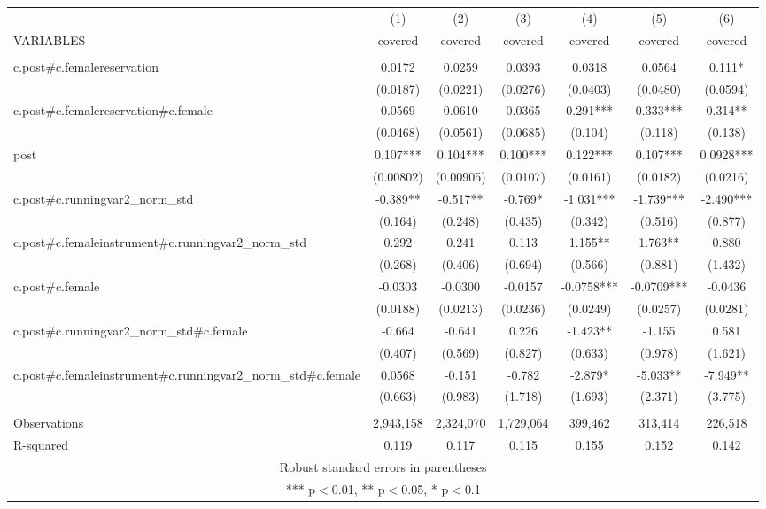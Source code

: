 \begin{tabular}{lcccccc} \hline
 & (1) & (2) & (3) & (4) & (5) & (6) \\
VARIABLES & covered & covered & covered & covered & covered & covered \\ \hline
 &  &  &  &  &  &  \\
c.post\#c.femalereservation & 0.0172 & 0.0259 & 0.0393 & 0.0318 & 0.0564 & 0.111* \\
 & (0.0187) & (0.0221) & (0.0276) & (0.0403) & (0.0480) & (0.0594) \\
c.post\#c.femalereservation\#c.female & 0.0569 & 0.0610 & 0.0365 & 0.291*** & 0.333*** & 0.314** \\
 & (0.0468) & (0.0561) & (0.0685) & (0.104) & (0.118) & (0.138) \\
post & 0.107*** & 0.104*** & 0.100*** & 0.122*** & 0.107*** & 0.0928*** \\
 & (0.00802) & (0.00905) & (0.0107) & (0.0161) & (0.0182) & (0.0216) \\
c.post\#c.runningvar2\_norm\_std & -0.389** & -0.517** & -0.769* & -1.031*** & -1.739*** & -2.490*** \\
 & (0.164) & (0.248) & (0.435) & (0.342) & (0.516) & (0.877) \\
c.post\#c.femaleinstrument\#c.runningvar2\_norm\_std & 0.292 & 0.241 & 0.113 & 1.155** & 1.763** & 0.880 \\
 & (0.268) & (0.406) & (0.694) & (0.566) & (0.881) & (1.432) \\
c.post\#c.female & -0.0303 & -0.0300 & -0.0157 & -0.0758*** & -0.0709*** & -0.0436 \\
 & (0.0188) & (0.0213) & (0.0236) & (0.0249) & (0.0257) & (0.0281) \\
c.post\#c.runningvar2\_norm\_std\#c.female & -0.664 & -0.641 & 0.226 & -1.423** & -1.155 & 0.581 \\
 & (0.407) & (0.569) & (0.827) & (0.633) & (0.978) & (1.621) \\
c.post\#c.femaleinstrument\#c.runningvar2\_norm\_std\#c.female & 0.0568 & -0.151 & -0.782 & -2.879* & -5.033** & -7.949** \\
 & (0.663) & (0.983) & (1.718) & (1.693) & (2.371) & (3.775) \\
 &  &  &  &  &  &  \\
Observations & 2,943,158 & 2,324,070 & 1,729,064 & 399,462 & 313,414 & 226,518 \\
 R-squared & 0.119 & 0.117 & 0.115 & 0.155 & 0.152 & 0.142 \\ \hline
\multicolumn{7}{c}{ Robust standard errors in parentheses} \\
\multicolumn{7}{c}{ *** p$<$0.01, ** p$<$0.05, * p$<$0.1} \\
\end{tabular}
